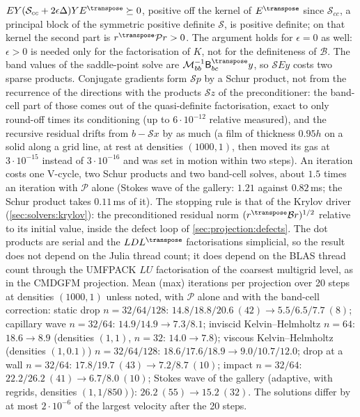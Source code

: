 $EY(\mathcal S_{cc}+2\epsilon\Delta)YE^{\transpose}\succeq0$, positive off the
kernel of $E^{\transpose}$ since $\mathcal S_{cc}$, a principal block of the
symmetric positive definite $\mathcal S$, is positive definite; on that kernel
the second part is $r^{\transpose}\mathcal Pr>0$. The argument holds for
$\epsilon=0$ as well: $\epsilon>0$ is needed only for the factorisation of
$K$, not for the definiteness of $\mathcal B$. The band values of the saddle-point solve are
$\mathcal M_{bb}^{-1}\mathsf B_{bc}^{\transpose}y$, so $\mathcal SEy$ costs two
sparse products. Conjugate gradients form $\mathcal Sp$ by a Schur product,
not from the recurrence of the directions with the products $\mathcal Sz$ of
the preconditioner: the band-cell part of those comes out of the
quasi-definite factorisation, exact to only round-off times its conditioning
(up to $6\cdot10^{-12}$ relative measured),
and the recursive residual drifts from $b-\mathcal Sx$ by as much (a film of
thickness $0.95h$ on a solid along a grid line, at rest at densities
$(1000,1)$, then moved its gas at $3\cdot10^{-15}$ instead of $3\cdot10^{-16}$
and was set in motion within two steps). An iteration costs one V-cycle, two
Schur products and two band-cell solves, about $1.5$ times an iteration with
$\mathcal P$ alone (Stokes wave of the gallery: $1.21$ against $0.82$\,ms; the
Schur product takes $0.11$\,ms of it). The
stopping rule is that of the Krylov driver (\cref{sec:solvers:krylov}): the
preconditioned residual norm $(r^{\transpose}\mathcal Br)^{1/2}$ relative to
its initial value, inside the defect loop of \cref{sec:projection:defects}.
The dot products are serial and the $LDL^{\transpose}$ factorisations
simplicial, so the result does not depend on the Julia thread count; it does
depend on the BLAS thread count through the UMFPACK $LU$ factorisation of the
coarsest multigrid level, as in the CMDGFM projection. Mean (max)
iterations per projection over 20 steps at densities $(1000,1)$ unless noted,
with $\mathcal P$ alone and with the band-cell correction: static drop
$n=32/64/128$: $14.8/18.8/20.6\ (42)\to5.5/6.5/7.7\ (8)$; capillary wave
$n=32/64$: $14.9/14.9\to7.3/8.1$; inviscid Kelvin--Helmholtz $n=64$:
$18.6\to8.9$ (densities $(1,1)$, $n=32$: $14.0\to7.8$); viscous
Kelvin--Helmholtz  (densities $(1,0.1)$) $n=32/64/128$:
$18.6/17.6/18.9\to9.0/10.7/12.0$; drop at a wall $n=32/64$:
$17.8/19.7\ (43)\to7.2/8.7\ (10)$; impact $n=32/64$:
$22.2/26.2\ (41)\to6.7/8.0\ (10)$; Stokes wave of the gallery (adaptive, with
regrids, densities $(1,1/850)$): $26.2\ (55)\to15.2\ (32)$. The solutions differ by at most
$2\cdot10^{-6}$ of the largest velocity after the 20 steps.

